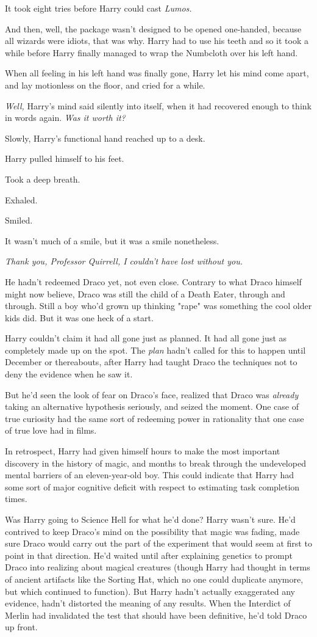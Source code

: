 It took eight tries before Harry could cast \emph{Lumos.}

And then, well, the package wasn't designed to be opened one-handed, because
all wizards were idiots, that was why. Harry had to use his teeth and so it
took a while before Harry finally managed to wrap the Numbcloth over his left
hand.

When all feeling in his left hand was finally gone, Harry let his mind come
apart, and lay motionless on the floor, and cried for a while.

\emph{Well,} Harry's mind said silently into itself, when it had recovered
enough to think in words again. \emph{Was it worth it?}

Slowly, Harry's functional hand reached up to a desk.

Harry pulled himself to his feet.

Took a deep breath.

Exhaled.

Smiled.

It wasn't much of a smile, but it was a smile nonetheless.

\emph{Thank you, Professor Quirrell, I couldn't have lost without you.}

He hadn't redeemed Draco yet, not even close. Contrary to what Draco himself
might now believe, Draco was still the child of a Death Eater, through and
through. Still a boy who'd grown up thinking "rape" was something the cool
older kids did. But it was one heck of a start.

Harry couldn't claim it had all gone just as planned. It had all gone just as
completely made up on the spot. The \emph{plan} hadn't called for this to
happen until December or thereabouts, after Harry had taught Draco the
techniques not to deny the evidence when he saw it.

But he'd seen the look of fear on Draco's face, realized that Draco was
\emph{already} taking an alternative hypothesis seriously, and seized the
moment. One case of true curiosity had the same sort of redeeming power in
rationality that one case of true love had in films.

In retrospect, Harry had given himself hours to make the most important
discovery in the history of magic, and months to break through the undeveloped
mental barriers of an eleven-year-old boy. This could indicate that Harry had
some sort of major cognitive deficit with respect to estimating task completion
times.

Was Harry going to Science Hell for what he'd done? Harry wasn't sure. He'd
contrived to keep Draco's mind on the possibility that magic was fading, made
sure Draco would carry out the part of the experiment that would seem at first
to point in that direction. He'd waited until after explaining genetics to
prompt Draco into realizing about magical creatures (though Harry had thought
in terms of ancient artifacts like the Sorting Hat, which no one could
duplicate anymore, but which continued to function). But Harry hadn't actually
exaggerated any evidence, hadn't distorted the meaning of any results. When the
Interdict of Merlin had invalidated the test that should have been definitive,
he'd told Draco up front.

